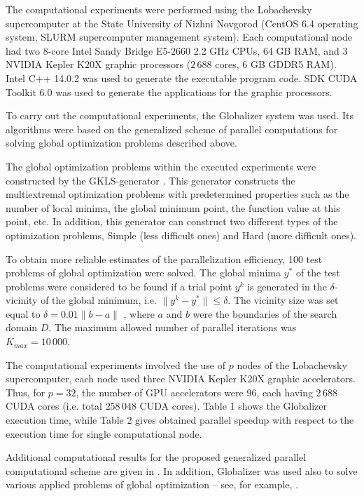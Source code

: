 \documentclass[
11pt,%
tightenlines,%
twoside,%
onecolumn,%
nofloats,%
nobibnotes,%
nofootinbib,%
superscriptaddress,%
noshowpacs,%
centertags]%
{revtex4}
\begin{document}
The computational experiments were performed using the Lobachevsky supercomputer at the State University of Nizhni Novgorod (CentOS 6.4 operating system, SLURM supercomputer management system). Each computational node had two 8-core Intel Sandy Bridge E5-2660 2.2 GHz CPUs, 64 GB RAM, and 3 NVIDIA Kepler K20X graphic processors ($2\,688$ cores, 6 GB GDDR5 RAM). Intel C++ 14.0.2 was used to generate the executable program code. SDK CUDA Toolkit 6.0 was used to generate the applications for the graphic processors.

To carry out the computational experiments, the Globalizer system \cite{Sysoyev} was used. Its algorithms were based on the generalized scheme of parallel computations for solving global optimization problems described above.
 
The global optimization problems within the executed experiments were constructed by the GKLS-generator \cite{Gaviano}. This generator constructs the multiextremal optimization problems with predetermined properties such as the number of local minima, the global minimum point, the function value at this point, etc. In addition, this generator can construct two different types of the optimization problems, Simple (less difficult ones) and Hard (more difficult ones).

To obtain more reliable estimates of the parallelization efficiency, 100 test problems of global optimization were solved. The global minima $y^\ast$ of the test problems were considered to be found if a trial point $y^k$ is generated in the $\delta$-vicinity of the global minimum, i.e. $\| y^k - y^ \ast \| \leq \delta$. The vicinity size was set equal to $\delta = 0.01 \|b - a \|$ , where $a$ and $b$ were the boundaries of the search domain $D$. The maximum allowed number of parallel iterations was $K_{max} = 10\,000$.

The computational experiments involved the use of $p$ nodes of the Lobachevsky supercomputer, each node used three NVIDIA Kepler K20X graphic accelerators. Thus, for $p = 32$, the number of GPU accelerators were 96, each having $2\,688$ CUDA cores (i.e. total $258\,048$ CUDA cores). Table 1 shows the Globalizer execution time, while Table 2 gives obtained parallel speedup with respect to the execution time for single computational node.

Additional computational results for the proposed generalized parallel computational scheme are given in \cite{Gergel1, Gergel2, Barkalov, Gergel3, Gergel4}. In addition, Globalizer was used also to solve various applied problems of global optimization -- see, for example, \cite{Modorskii, Gergel6}.
\end{document}
